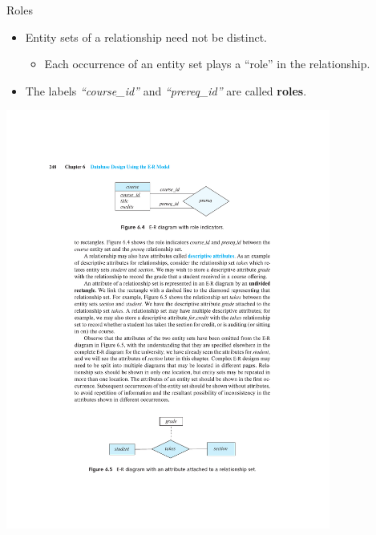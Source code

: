 \documentclass{beamer}
\begin{document}
\begin{frame}{Roles}
    \begin{itemize}
        \item Entity sets of a relationship need not be distinct.
        \begin{itemize}
            \item Each occurrence of an entity set plays a ``role'' in the relationship.
        \end{itemize}
        \item The labels \textit{``course\_id''} and \textit{``prereq\_id''} are called \textbf{roles}.
    \end{itemize}
    \centering
    \includegraphics[trim={6.5cm 20.5cm 6.5cm 4cm}, clip, width=0.8\textwidth]{figures/p248}
\end{frame}
\end{document}
